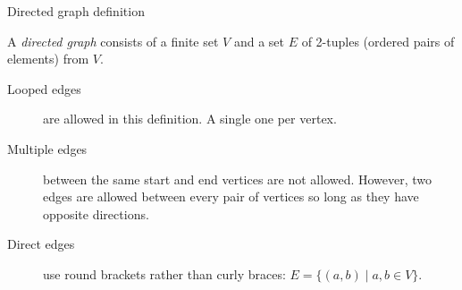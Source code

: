 \begin{frame}{Directed graph definition}
	\begin{definition}
	A \emph{directed graph} consists of a finite set $V$ and a set $E$ of 2-tuples (ordered pairs of elements) from $V$.
	\end{definition}
	\vspace{0.2cm}
	\begin{description}
		\item[Looped edges] are allowed in this definition. A single one per vertex.
		\item[Multiple edges] between the same start and end vertices are not allowed. However, two edges are allowed between every pair of vertices so long as they have opposite directions.
		\item[Direct edges] use round brackets rather than curly braces: $E = \{ (a,b) \mid a,b \in V\}$.
	\end{description}
\end{frame}



